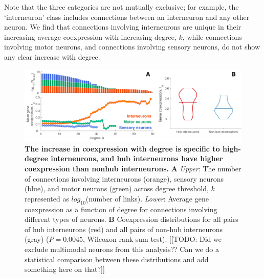 \documentclass[10pt,letterpaper]{article}
\begin{document}
Note that the three categories are not mutually exclusive; for example, the `interneuron' class includes connections between an interneuron and any other neuron.
We find that connections involving interneurons are unique in their increasing average coexpression with increasing degree, $k$, while connections involving motor neurons, and connections involving sensory neurons, do not show any clear increase with degree.


\begin{figure}[h]
\centering
   \includegraphics[width=1\textwidth]{DegreeType.pdf}
 \caption{
\textbf{The increase in coexpression with degree is specific to high-degree interneurons, and hub interneurons have higher coexpression than nonhub interneurons.}
\textbf{A} \emph{Upper}: The number of connections involving interneurons (orange), sensory neurons (blue), and motor neurons (green) across degree threshold, $k$ represented as $log_{10}$(number of links).
\emph{Lower}: Average gene coexpression as a function of degree for connections involving different types of neurons.
\textbf{B} Coexpression distributions for all pairs of hub interneurons (red) and all pairs of non-hub interneurons (gray) ($P = 0.0045$, Wilcoxon rank sum test).
[[TODO: Did we exclude multimodal neurons from this analysis?? Can we do a statistical comparison between these distributions and add something here on that?]]
}
 \label{fig:interneuron_dep}

\end{figure}
\end{document}
